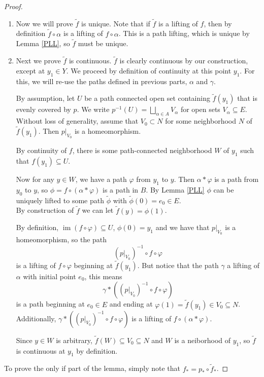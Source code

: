 \documentclass{amsart}
\theoremstyle{definition}
\theoremstyle{remark}
\numberwithin{equation}{section}
\begin{document}
\begin{proof}
\begin{enumerate}
        \item Now we will prove $\tilde{f}$ is unique. Note that if $\tilde{f}$ is a lifting of $f$, then by definition $\tilde{f} \circ \alpha$ is a lifting of $f \circ \alpha$. This is a path lifting, which is unique by Lemma \ref{PLL}, so $\tilde{f}$ must be unique.

        \item Next we prove $\tilde{f}$ is continuous. $\tilde{f}$ is clearly continuous by our construction, except at $y_1 \in Y$. We proceed by definition of continuity at this point $y_1$. For this, we will re-use the paths defined in previous parts, $\alpha$ and $\gamma$. 
        
        By assumption, let $U$ be a path connected open set containing $\tilde{f}(y_1)$ that is evenly covered by $p$. We write $p^{-1}(U) = \bigsqcup_{\alpha \in A} V_\alpha$ for open sets $V_\alpha \subseteq E$. Without loss of generality, assume that $V_0 \subset N$ for some neighborhood $N$ of $\tilde{f}(y_1)$. Then $p|_{V_0}$ is a homeomorphism.

        By continuity of $f$, there is some path-connected neighborhood $W$ of $y_1$ such that $f(y_1) \subseteq U$.

        Now for any $y \in W$, we have a path $\varphi$ from $y_1$ to $y$. Then $\alpha \ast \varphi$ is a path from $y_0$ to $y$, so $\phi = f \circ (\alpha \ast \varphi)$ is a path in $B$. By Lemma \ref{PLL} $\phi$ can be uniquely lifted to some path $\tilde{\phi}$ with $\tilde{\phi}(0) = e_0 \in E$.\\
        By construction of $\tilde{f}$ we can let $\tilde{f}(y) = \phi(1)$.

        By definition, $\operatorname{im}(f \circ \varphi) \subseteq U$, $\phi(0) = y_1$ and  we have that $p|_{V_0}$ is a homeomorphism, so the path 
        $$(p|_{V_0})^{-1} \circ f \circ \varphi$$
        is a lifting of $f \circ \varphi$ beginning at $\tilde{f}(y_1)$. But notice that the path $\gamma$ a lifting of $\alpha$ with initial point $e_0$, this means 
        $$\gamma \ast ((p|_{V_0})^{-1} \circ f \circ \varphi)$$
        is a path beginning at $e_0 \in E$ and ending at $\varphi(1) = \tilde{f}(y_1) \in V_0 \subseteq N$. Additionally, $\gamma \ast ((p|_{V_0})^{-1} \circ f \circ \varphi)$ is a lifting of $f \circ (\alpha \ast \varphi)$.

        Since $y \in W$ is arbitrary, $\tilde{f}(W) \subseteq V_0 \subseteq N$ and $W$ is a neiborhood of $y_1$, so $\tilde{f}$ is continuous at $y_1$ by definition.
    \end{enumerate}

    \noindent To prove the only if part of the lemma, simply note that $f_\ast = p_\ast \circ \tilde{f}_\ast$.
\end{proof}
\end{document}
